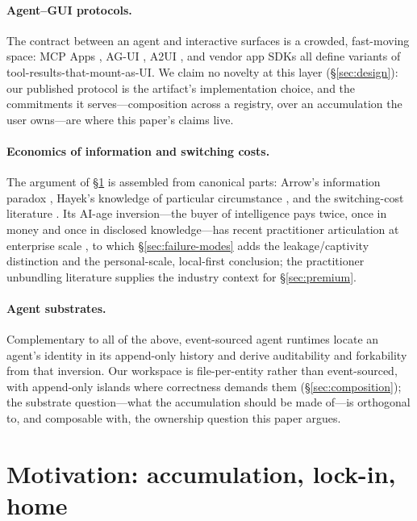 \documentclass[11pt]{article}
\begin{document}
\paragraph{Agent--GUI protocols.}
The contract between an agent and interactive surfaces is a crowded, fast-moving
space: MCP Apps \citep{mcp-apps}, AG-UI \citep{ag-ui}, A2UI \citep{a2ui}, and
vendor app SDKs all define variants of tool-results-that-mount-as-UI. We claim no
novelty at this layer (\S\ref{sec:design}): our published protocol is the
artifact's implementation choice, and the commitments it serves---composition
across a registry, over an accumulation the user owns---are where this paper's
claims live.

\paragraph{Economics of information and switching costs.}
The argument of \S\ref{sec:motivation} is assembled from canonical parts: Arrow's
information paradox \citep{arrow-1962}, Hayek's knowledge of particular
circumstance \citep{hayek-1945}, and the switching-cost literature
\citep{klemperer,shapiro-varian}. Its AI-age inversion---the buyer of
intelligence pays twice, once in money and once in disclosed knowledge---has
recent practitioner articulation at enterprise scale \citep{nadella-rip}, to
which \S\ref{sec:failure-modes} adds the leakage/captivity distinction and the
personal-scale, local-first conclusion; the practitioner unbundling literature
\citep{saas-unbundling} supplies the industry context for \S\ref{sec:premium}.

\paragraph{Agent substrates.}
Complementary to all of the above, event-sourced agent runtimes
\citep{log-is-the-agent} locate an agent's identity in its append-only history
and derive auditability and forkability from that inversion. Our workspace is
file-per-entity rather than event-sourced, with append-only islands where
correctness demands them (\S\ref{sec:composition}); the substrate question---what
the accumulation should be made of---is orthogonal to, and composable with, the
ownership question this paper argues.

\section{Motivation: accumulation, lock-in, home}
\label{sec:motivation}
\end{document}
